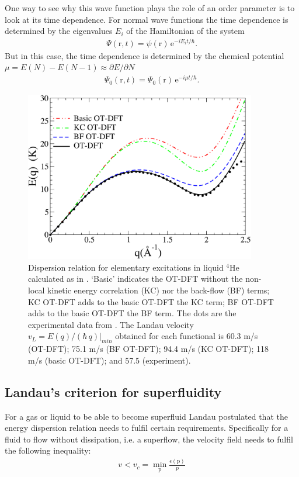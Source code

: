 \documentclass[11pt,a4paper,twoside]{article}
\renewcommand{\vec}[1]{\bm{\mathrm{#1}}}
\begin{document}
			One way to see why this wave function plays the role of an order parameter is to look at its time dependence. For normal wave functions the time dependence is determined by the eigenvalues $E_i$ of the Hamiltonian of the system
			\begin{align}
				\Psi(\vec{r},t)=\psi(\vec{r})\,\mathrm{e}^{-iE_it/\hbar}.
			\end{align}
			But in this case, the time dependence is determined by the chemical potential $\mu=E(N)-E(N-1)\approx \partial E/\partial N$
			\begin{align}
				\Psi_0(\vec{r},t)=\Psi_0(\vec{r})\,\mathrm{e}^{-i\mu t/\hbar}.
			\end{align}

		\begin{figure}[t]
			\begin{center}
				\includegraphics[width=0.9\textwidth]{dispersion-relation}
			\end{center}
			\caption{Dispersion relation for elementary excitations in liquid $^4$He calculated as in  \cite{Mat10a}. `Basic' indicates the OT-DFT without the non-local kinetic energy correlation (KC) nor the back-flow (BF) terms; KC OT-DFT adds  to the basic OT-DFT the KC term; BF OT-DFT adds to the basic OT-DFT the BF term. The dots are the experimental data from \cite{Don81}. The Landau velocity $v_L = E(q)/(\hbar\,q)|_{min}$ obtained for each functional is  60.3 m/s (OT-DFT); 75.1 m/s (BF OT-DFT); 94.4 m/s (KC OT-DFT); 118 m/s (basic OT-DFT); and 57.5 (experiment).}
			\label{fig:dispersion-relation}
		\end{figure}
			
		\subsection{Landau's criterion for superfluidity}
			For a gas or liquid to be able to become superfluid Landau postulated that the energy dispersion relation needs to fulfil certain requirements. Specifically for a fluid to flow  without dissipation, i.e. a superflow, the velocity field needs to fulfil the following inequality:
			\begin{align}
				v<v_c = \min_{\vec{p}}\frac{\epsilon(\vec{p})}{p}
			\end{align}
			
\end{document}
